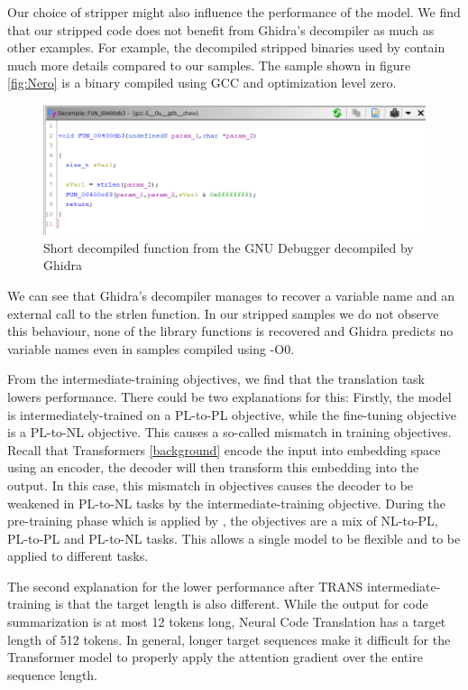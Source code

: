 Our choice of stripper might also influence the performance of the model. We find that our stripped code does not benefit from Ghidra's decompiler as much as other examples. For example, the decompiled stripped binaries used by \citeauthor{Nero} contain much more details compared to our samples. The sample shown in figure \ref{fig:Nero} is a binary compiled using GCC and optimization level zero.

\label{fig:Nero}
\begin{figure}[!h]
  \centering
  \includegraphics[width=\linewidth]{img/Nero.png}
  \caption{Short decompiled function from the GNU Debugger \cite{Nero} decompiled by Ghidra}
\end{figure}

We can see that Ghidra's decompiler manages to recover a variable name and an external call to the strlen function. In our stripped samples we do not observe this behaviour, none of the library functions is recovered and Ghidra predicts no variable names even in samples compiled using -O0.

From the intermediate-training objectives, we find that the translation task lowers performance. There could be two explanations for this: Firstly, the model is intermediately-trained on a PL-to-PL objective, while the fine-tuning objective is a PL-to-NL objective. This causes a so-called mismatch in training objectives. Recall that Transformers \ref{background} encode the input into embedding space using an encoder, the decoder will then transform this embedding into the output. In this case, this mismatch in objectives causes the decoder to be weakened in PL-to-NL tasks by the intermediate-training objective. During the pre-training phase which is applied by \citeauthor{CodeT5}, the objectives are a mix of NL-to-PL, PL-to-PL and PL-to-NL tasks. This allows a single model to be flexible and to be applied to different tasks.

The second explanation for the lower performance after TRANS intermediate-training is that the target length is also different. While the output for code summarization is at most 12 tokens long, Neural Code Translation has a target length of 512 tokens. In general, longer target sequences make it difficult for the Transformer model to properly apply the attention gradient over the entire sequence length.

